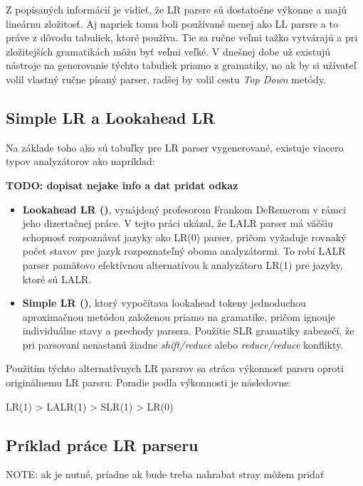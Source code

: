 Z popísaných informácií je vidieť, že LR parsre sú dostatočne výkonne a majú lineárnu zložitosť. Aj napriek tomu boli používané menej ako LL parsre a to práve z dôvodu tabuliek, ktoré používa. Tie sa ručne veľmi tažko vytvárajú a pri zložitejších gramatikách môžu byť veľmi veľké. V dnešnej dobe už existujú nástroje na generovanie týchto tabuliek priamo z gramatiky, no ak by si užívateľ volil vlastný ručne písaný parser, radšej by volil cestu \textit{Top Down} metódy.

\subsection{Simple LR a Lookahead LR}
Na základe toho ako sú tabuľky pre LR parser vygenerované, existuje viacero typov analyzátorov ako napríklad:

\textbf{TODO: dopisat nejake info a dat pridat odkaz}

\begin{itemize}
\item \textbf{Lookahead LR (\textbf{})}, vynájdený profesorom  Frankom DeRemerom v rámci jeho dizertačnej práce\cite{deremer1969practical}. V tejto práci ukázal, že LALR parser má väčšiu schopnosť rozpoznávať jazyky ako LR(0) parser, pričom vyžaduje rovnaký počet stavov pre jazyk rozpoznateľný oboma analyzátormi. To robí LALR parser pamäťovo efektívnou alternatívou k analyzátoru LR(1) pre jazyky, ktoré sú LALR.

\item \textbf{Simple LR ()}, ktorý vypočítava lookahead tokeny jednoduchou aproximačnou metódou založenou priamo na gramatike, pričom ignouje individuálne stavy a prechody parsera. Použitie SLR gramatiky zabezečí, že pri parsovaní nenastanú žiadne \textit{shift/reduce} alebo \textit{reduce/reduce} konflikty\cite{deremer1971simple}.
\end{itemize}

Použitím týchto alternatívnych LR parsrov sa stráca výkonnosť parsru oproti originálnemu LR parsru. Poradie podľa výkonnosti je následovne:
\begin{center}
 LR(1) > LALR(1) > SLR(1) > LR(0) \cite{grune2007parsing}
\end{center}

\subsection{Príklad práce LR parseru}
NOTE: ak je nutné, príadne ak bude treba nahrabat stray môžem pridať


